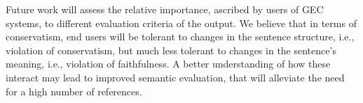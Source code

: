 \documentclass[letterpaper, 11pt]{article}
\begin{document}
%
%
%

Future work will assess the relative importance, ascribed by users of GEC systems,
to different evaluation criteria of the output. We believe that in terms of conservatism,
end users will be tolerant to changes in the sentence structure, i.e.,
violation of conservatism, but much less tolerant to changes in the sentence's meaning,
i.e., violation of faithfulness. A better understanding of how these interact
may lead to improved semantic evaluation, that will alleviate the need
for a high number of references.




\end{document}
